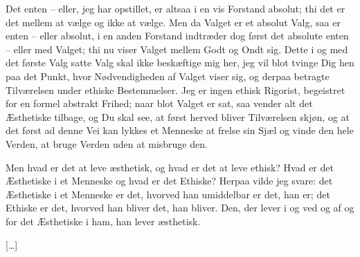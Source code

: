 \documentclass[12pt,a4paper]{article}
\begin{document}
Det enten – eller, jeg har opstillet, er altsaa i en vis Forstand absolut; thi det er det mellem at vælge og ikke at vælge. Men da Valget er et absolut Valg, saa er enten – eller absolut, i en anden Forstand indtræder dog først det absolute enten – eller med Valget; thi nu viser Valget mellem Godt og Ondt sig. Dette i og med det første Valg satte Valg skal ikke beskæftige mig her, jeg vil blot tvinge Dig hen paa det Punkt, hvor Nødvendigheden af Valget viser sig, og derpaa betragte Tilværelsen under ethiske Bestemmelser. Jeg er ingen ethisk Rigorist, begeistret for en formel abstrakt Frihed; naar blot Valget er sat, saa vender alt det Æsthetiske tilbage, og Du skal see, at først herved bliver Tilværelsen skjøn, og at det først ad denne Vei kan lykkes et Menneske at frelse sin Sjæl og vinde den hele Verden, at bruge Verden uden at misbruge den.

Men hvad er det at leve æsthetisk, og hvad er det at leve ethisk? Hvad er det Æsthetiske i et Menneske og hvad er det Ethiske? Herpaa vilde jeg svare: det Æsthetiske i et Menneske er det, hvorved han umiddelbar er det, han er; det Ethiske er det, hvorved han bliver det, han bliver. Den, der lever i og ved og af og for det Æsthetiske i ham, han lever æsthetisk.

[…]
\end{document}
